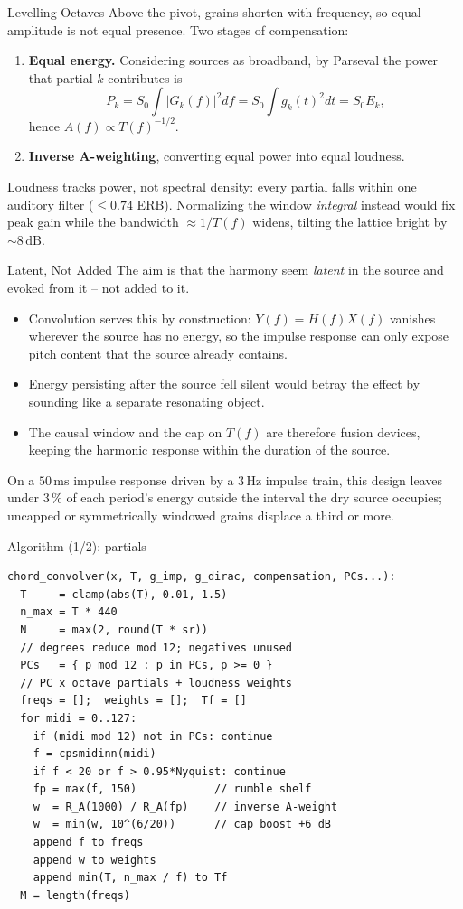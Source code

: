 \documentclass{beamer}
\begin{document}
\begin{frame}{Levelling Octaves}
Above the pivot, grains shorten with frequency, so equal amplitude is not
equal presence. Two stages of compensation:
\begin{enumerate}
\item \textbf{Equal energy.} Considering sources as broadband, by Parseval the power
      that partial $k$ contributes is
      \[
        P_k = S_0\!\int\! \bigl|G_k(f)\bigr|^2 df = S_0\!\int\! g_k(t)^2 dt =
        S_0 E_k ,
      \]
      hence $A(f)\propto T(f)^{-1/2}$.
\item \textbf{Inverse A-weighting}, converting equal power into equal loudness.
\end{enumerate}
{\small
Loudness tracks power, not spectral density: every partial falls within one
auditory filter ($\le 0.74$ ERB). Normalizing the window \emph{integral}
instead would fix peak gain while the bandwidth $\approx 1/T(f)$ widens, tilting
the lattice bright by ${\sim}8\,\mathrm{dB}$.}
\end{frame}

\begin{frame}{Latent, Not Added}
The aim is that the harmony seem \emph{latent} in the source and evoked from
it -- not added to it.
\begin{itemize}
\item Convolution serves this by construction: $Y(f)=H(f)X(f)$ vanishes
      wherever the source has no energy, so the impulse response can only expose pitch
      content that the source already contains.
\item Energy persisting after the source fell silent would betray the effect by
      sounding like a separate resonating object.
\item The causal window and the cap on $T(f)$ are therefore fusion devices,
      keeping the harmonic response within the duration of the source.
\end{itemize}
{\small On a $50\,\mathrm{ms}$ impulse response driven by a $3\,\mathrm{Hz}$
impulse train, this design leaves under $3\,\%$ of each period's energy
outside the interval the dry source occupies; uncapped or symmetrically
windowed grains displace a third or more.}
\end{frame}

\begin{frame}[fragile]{Algorithm (1/2): partials}
\scriptsize
\begin{verbatim}
chord_convolver(x, T, g_imp, g_dirac, compensation, PCs...):
  T     = clamp(abs(T), 0.01, 1.5)
  n_max = T * 440
  N     = max(2, round(T * sr))
  // degrees reduce mod 12; negatives unused
  PCs   = { p mod 12 : p in PCs, p >= 0 }
  // PC x octave partials + loudness weights
  freqs = [];  weights = [];  Tf = []
  for midi = 0..127:
    if (midi mod 12) not in PCs: continue
    f = cpsmidinn(midi)
    if f < 20 or f > 0.95*Nyquist: continue
    fp = max(f, 150)            // rumble shelf
    w  = R_A(1000) / R_A(fp)    // inverse A-weight
    w  = min(w, 10^(6/20))      // cap boost +6 dB
    append f to freqs
    append w to weights
    append min(T, n_max / f) to Tf
  M = length(freqs)
\end{verbatim}
\end{frame}
\end{document}
